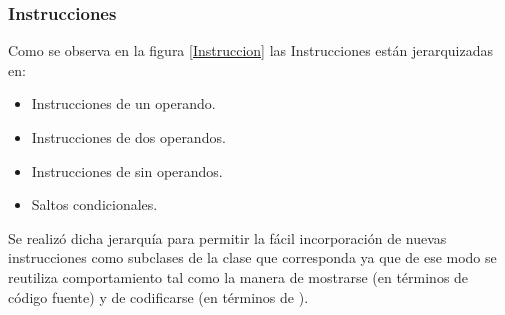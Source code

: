 
\subsubsection{Instrucciones}
Como se observa en la figura \ref{Instruccion} las Instrucciones están jerarquizadas en:

\begin{itemize}
\item Instrucciones de un operando.
\item Instrucciones de dos operandos.
\item Instrucciones de sin operandos.
\item Saltos condicionales.
\end{itemize}

Se realizó dicha jerarquía para permitir la fácil incorporación de nuevas instrucciones como subclases de la clase que corresponda ya que de ese modo se reutiliza comportamiento tal como la manera de mostrarse (en términos de código fuente) y de codificarse (en términos de \codmaq).


